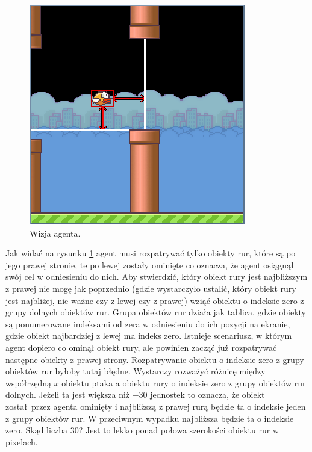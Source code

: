 \documentclass[a4paper, 12pt,twoside]{report}
\begin{document}
\begin{figure}[!htb]
	\begin{center}
	\includegraphics[scale=0.50]{agent_vision.png}
	\end{center}
	\caption{Wizja agenta.}
	\label{agent_vision}
\end{figure}

Jak widać na rysunku \ref{agent_vision} agent musi rozpatrywać tylko obiekty
rur, które są po jego prawej stronie, te po lewej zostały ominięte co oznacza,
że agent osiągnął swój cel w odniesieniu do nich. Aby stwierdzić, który obiekt
rury jest najbliższym z prawej nie mogę jak poprzednio (gdzie wystarczyło
ustalić, który obiekt rury jest najbliżej, nie ważne czy z lewej czy z prawej)
wziąć obiektu o indeksie zero z grupy dolnych obiektów rur. Grupa
obiektów rur działa jak tablica, gdzie obiekty są ponumerowane indeksami od
zera w odniesieniu do ich pozycji na ekranie, gdzie obiekt najbardziej z lewej
ma indeks zero. Istnieje scenariusz, w którym agent dopiero co ominął obiekt
rury, ale powinien zacząć już rozpatrywać następne obiekty z prawej strony.
Rozpatrywanie obiektu o indeksie zero z grupy obiektów rur byłoby tutaj błędne.
Wystarczy rozważyć różnicę między współrzędną $x$ obiektu ptaka a obiektu rury
o indeksie zero z grupy obiektów rur dolnych. Jeżeli ta jest większa niż $-30$
jednostek to oznacza, że obiekt został przez agenta ominięty i najbliższą z
prawej rurą będzie ta o indeksie jeden z grupy obiektów rur. W przeciwnym
wypadku najbliższa będzie ta o indeksie zero. Skąd liczba $30$? Jest to lekko
ponad połowa szerokości obiektu rur w pixelach.
\end{document}
